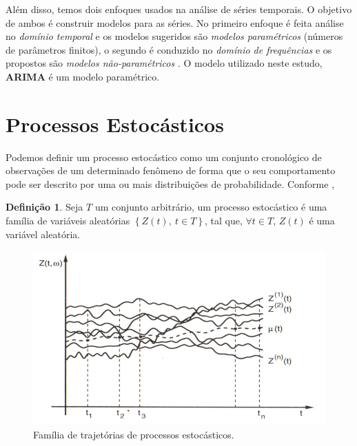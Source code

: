 \documentclass[
	12pt,				%
	openright,			%
	oneside,      %
	a4paper,			%
	english,			%
	french,				%
	spanish,			%
	brazil,				%
	]{abntex2}\usepackage[]{graphicx}\usepackage[table]{xcolor}
\theoremstyle{definition}
\newtheorem{definition}{Definição}[section]
\theoremstyle{remark}
\begin{document}
Além disso, temos dois enfoques usados na análise de séries temporais. O objetivo de ambos é construir modelos para as séries. No primeiro enfoque é feita análise no \textit{domínio temporal} e os modelos sugeridos são \textit{modelos paramétricos} (números de parâmetros finitos), o segundo é conduzido no \textit{domínio de frequências} e os propostos são 
\textit{modelos não-paramétricos} \cite{morettin2006analise}. O modelo utilizado neste 
estudo, \textbf{ARIMA} é um modelo paramétrico.




  \section{Processos Estocásticos}
  
Podemos definir um processo estocástico como um conjunto cronológico de observações de um determinado fenômeno de forma que o seu comportamento pode ser descrito por uma ou mais distribuições de probabilidade. Conforme \cite{morettin2006analise},


\begin{definition}

Seja $T$ um conjunto arbitrário, um processo estocástico é uma família de variáveis aleatórias 
$\left\{Z(t),\ t \in T \right\}$, tal que, $\forall t \in T$,  $Z(t)$ é uma variável aleatória.

\end{definition}
  
\begin{figure}
  \caption{\label{img4}Família de trajetórias de processos estocásticos.}
    \begin{center}
      \includegraphics[scale = 0.9]{image/img4.png}
    \end{center}
\end{figure}
\end{document}
